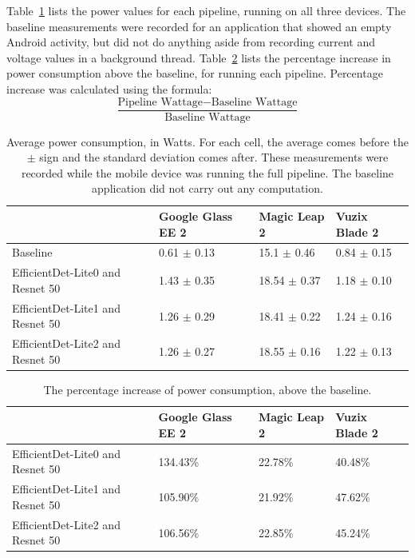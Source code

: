 Table~\ref{tab:mobile_power} lists the power values for each pipeline, running
on all three devices.
The baseline measurements were recorded for an application that showed an empty
Android activity, but did not do anything aside from recording current and
voltage values in a background thread.
Table~\ref{tab:mobile_power_pi} lists the percentage increase in power
consumption above the baseline, for running each pipeline.
Percentage increase was calculated using the formula:
\[
  \frac{\text{Pipeline Wattage} - \text{Baseline Wattage}}{
    \text{Baseline Wattage}}
\]

\begin{table}
\begin{tabular}{|l||l|l|l|}
  \hline
  & Google Glass EE 2 & Magic Leap 2 & Vuzix Blade 2\\
  \hline
  \hline
  Baseline & 0.61 $\pm$ 0.13 & 15.1 $\pm$ 0.46 & 0.84 $\pm$ 0.15\\
  EfficientDet-Lite0 and Resnet 50 & 1.43 $\pm$ 0.35 & 18.54 $\pm$ 0.37 & 1.18 $\pm$ 0.10\\
  EfficientDet-Lite1 and Resnet 50 & 1.26 $\pm$ 0.29 & 18.41 $\pm$ 0.22 & 1.24 $\pm$ 0.16\\
  EfficientDet-Lite2 and Resnet 50 & 1.26 $\pm$ 0.27 & 18.55 $\pm$ 0.16 & 1.22 $\pm$ 0.13\\
  \hline
\end{tabular}
  \caption{
    Average power consumption, in Watts.
    For each cell, the average comes before the $\pm$ sign and the standard
    deviation comes after.
    These measurements were recorded while the mobile device was running the
    full pipeline.
    The baseline application did not carry out any computation.
  }\label{tab:mobile_power}
\end{table}

\begin{table}
\begin{tabular}{|l||l|l|l|}
  \hline
  & Google Glass EE 2 & Magic Leap 2 & Vuzix Blade 2\\
  \hline
  \hline
  EfficientDet-Lite0 and Resnet 50 & 134.43\% & 22.78\%	& 40.48\%\\
  EfficientDet-Lite1 and Resnet 50 & 105.90\% & 21.92\% & 47.62\%\\
  EfficientDet-Lite2 and Resnet 50 & 106.56\% & 22.85\%	& 45.24\%\\
  \hline
\end{tabular}
  \caption{
    The percentage increase of power consumption, above the baseline.
  }\label{tab:mobile_power_pi}
\end{table}

